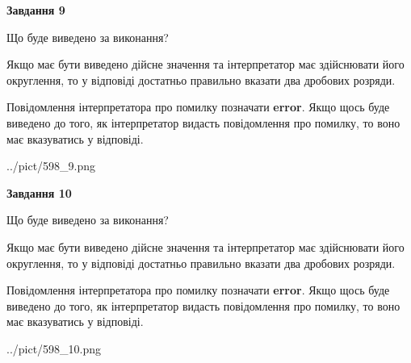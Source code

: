\documentclass[12pt, ukrainian]{article}
\begin{document}
{\begin {Large}
{\begin {center}\textbf{Завдання 9}\end {center}}\par
Що буде виведено за виконання? \par

Якщо має бути виведено дійсне значення та інтерпретатор має здійснювати його округлення, 
то у відповіді достатньо правильно вказати два дробових розряди.

Повідомлення інтерпретатора про помилку позначати \textbf{error}.
Якщо щось буде виведено до того, як інтерпретатор видасть повідомлення про помилку, 
то воно має вказуватись у відповіді. \par

\begin{center}
	{../pict/598_9.png}
\end{center}
\newpage

{\begin {center}\textbf{Завдання 10}\end {center}}\par
Що буде виведено за виконання? \par

Якщо має бути виведено дійсне значення та інтерпретатор має здійснювати його округлення, 
то у відповіді достатньо правильно вказати два дробових розряди.

Повідомлення інтерпретатора про помилку позначати \textbf{error}.
Якщо щось буде виведено до того, як інтерпретатор видасть повідомлення про помилку, 
то воно має вказуватись у відповіді. \par

\begin{center}
	{../pict/598_10.png}
\end{center}
\newpage

\end {Large}}
\end{document}
